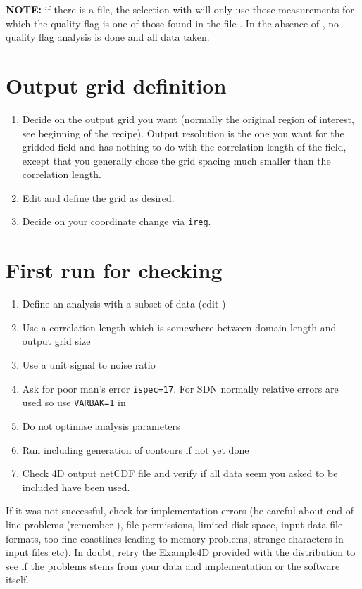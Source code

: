 \documentclass[a4paper,12pt,oneside,notitlepage]{book}
\newcommand{\file}[1]{\texttt{\color{MidnightBlue}{#1}}}
\newcommand{\command}[1]{\texttt{\color{RedOrange}{#1}}}
\begin{document}
{\bf NOTE:} if there is a \file{qflist} file, the selection with \command{divaselectorODV4} will only use those measurements for which the quality flag is one of those found in the file \file{qflist}. In the absence of \file{qflist}, no quality flag analysis is done and all data taken.
 


\section{Output grid definition}

\begin{enumerate}
\item
Decide on the output grid you want (normally the original region of interest, see beginning of the recipe). Output resolution is the one you want for the gridded field and has nothing to do with the correlation length of the field, except that you generally chose the grid spacing much smaller than the correlation length.
\item Edit \file{param.par} and define the grid as desired.
\item Decide on your coordinate change via {\tt ireg}.
\end{enumerate}


\section{First run for checking}
\begin{enumerate}
\item Define an analysis with a subset of data (edit \file{yearlist, monthlist, varlist})
\item Use a correlation length which is somewhere between domain length and output grid size
\item Use a unit signal to noise ratio
\item Ask for poor man's error {\tt ispec=17}.  For SDN normally relative errors are used so use {\tt VARBAK=1} in \file{param.par}
\item Do not optimise analysis parameters
\item Run \command{divadoall} including generation of contours if not yet done
\item Check 4D output netCDF file and verify if all data seem you asked to be included have been used.
\end{enumerate}
If it was not successful, check for implementation errors (be careful about end-of-line problems (remember \command{dos2unix}), file permissions, limited disk space, input-data file formats, too fine coastlines leading to memory problems, strange characters in input files etc). In doubt, retry the Example4D provided with the distribution to see if the problems stems from your data and implementation or the software itself.
\end{document}

